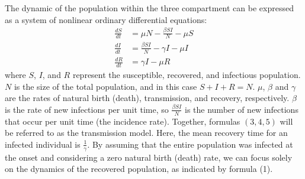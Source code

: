 \documentclass[12pt]{article}
\begin{document}
The dynamic of the population within the three compartment can be expressed as a system of nonlinear ordinary differential equations:
\begin{align}
    \frac{dS}{dt} &= \mu N - \frac{\beta SI}{N} - \mu S \\
    \frac{dI}{dt} &= \frac{\beta SI}{N} - \gamma I - \mu I \\
    \frac{dR}{dt} &= \gamma I - \mu R
\end{align}
where $S$, $I$, and $R$ represent the susceptible, recovered, and infectious population. $N$ is the size of the total population, and in this case $S + I + R = N$. $\mu$, $\beta$ and $\gamma$ are the rates of natural birth (death), transmission, and recovery, respectively. $\beta$ is the rate of new infections per unit time, so $\frac{\beta SI}{N}$ is the number of new infections that occur per unit time (the incidence rate). Together, formulas $(3,4,5)$ will be referred to as the transmission model. Here, the mean recovery time for an infected individual is $\frac{1}{\gamma}$. By assuming that the entire population was infected at the onset and considering a zero natural birth (death) rate, we can focus solely on the dynamics of the recovered population, as indicated by formula (1). 
\end{document}
